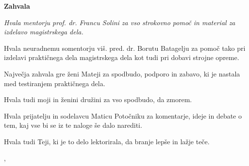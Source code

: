 \thispagestyle{empty}

\begin{center}
{\Large \textbf{\sc Zahvala}}
\end{center}
\vspace{0.5cm}

{\it\noindent
Hvala mentorju prof. dr. Francu Solini za vso strokovno pomoč in material za izdelavo magistrskega dela.

Hvala neuradnemu somentorju viš. pred. dr. Borutu Batagelju za pomoč tako pri izdelavi praktičnega dela magistrskega dela kot tudi pri dobavi strojne opreme.

Največja zahvala gre ženi Mateji za spodbudo, podporo in zabavo, ki je nastala med testiranjem praktičnega dela.

Hvala tudi moji in ženini družini za vso spodbudo, da zmorem.

Hvala prijatelju in sodelavcu Maticu Potočniku za komentarje, ideje in debate o tem, kaj vse bi se iz te naloge še dalo narediti.

Hvala tudi Teji, ki je to delo lektorirala, da branje lepše in lažje teče.

\vspace{0.5cm} \hfill \myname, \myyear
}